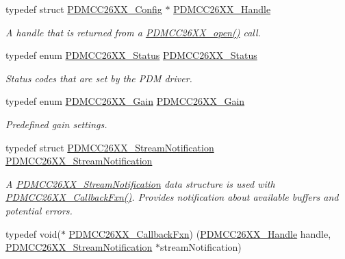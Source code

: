 \begin{DoxyCompactItemize}
typedef struct \hyperlink{struct_p_d_m_c_c26_x_x___config}{P\+D\+M\+C\+C26\+X\+X\+\_\+\+Config} $\ast$ \hyperlink{_p_d_m_c_c26_x_x_8h_ae5b9ecc0f8eb494e162b4a0a49c0636a}{P\+D\+M\+C\+C26\+X\+X\+\_\+\+Handle}
\begin{DoxyCompactList}\small\item\em A handle that is returned from a \hyperlink{_p_d_m_c_c26_x_x_8h_a431d9b71e0d0eebd5ab85960f1c82ee0}{P\+D\+M\+C\+C26\+X\+X\+\_\+open()} call. \end{DoxyCompactList}\item 
typedef enum \hyperlink{_p_d_m_c_c26_x_x_8h_afbfe993e790be75708df00186070a779}{P\+D\+M\+C\+C26\+X\+X\+\_\+\+Status} \hyperlink{_p_d_m_c_c26_x_x_8h_affb09af7b7de674b100b1170d574f86c}{P\+D\+M\+C\+C26\+X\+X\+\_\+\+Status}
\begin{DoxyCompactList}\small\item\em Status codes that are set by the P\+D\+M driver. \end{DoxyCompactList}\item 
typedef enum \hyperlink{_p_d_m_c_c26_x_x_8h_a8c2d67aee547a2c8228465034ae0267f}{P\+D\+M\+C\+C26\+X\+X\+\_\+\+Gain} \hyperlink{_p_d_m_c_c26_x_x_8h_a62dc3dc8663629a376fc5e4e546bfd05}{P\+D\+M\+C\+C26\+X\+X\+\_\+\+Gain}
\begin{DoxyCompactList}\small\item\em Predefined gain settings. \end{DoxyCompactList}\item 
typedef struct \hyperlink{struct_p_d_m_c_c26_x_x___stream_notification}{P\+D\+M\+C\+C26\+X\+X\+\_\+\+Stream\+Notification} \hyperlink{_p_d_m_c_c26_x_x_8h_abebd17c183efa14ae0ebe9c229f6c577}{P\+D\+M\+C\+C26\+X\+X\+\_\+\+Stream\+Notification}
\begin{DoxyCompactList}\small\item\em A \hyperlink{struct_p_d_m_c_c26_x_x___stream_notification}{P\+D\+M\+C\+C26\+X\+X\+\_\+\+Stream\+Notification} data structure is used with \hyperlink{_p_d_m_c_c26_x_x_8h_ab6fdee59a79029e938e3fbf0e446fa91}{P\+D\+M\+C\+C26\+X\+X\+\_\+\+Callback\+Fxn()}. Provides notification about available buffers and potential errors. \end{DoxyCompactList}\item 
typedef void($\ast$ \hyperlink{_p_d_m_c_c26_x_x_8h_ab6fdee59a79029e938e3fbf0e446fa91}{P\+D\+M\+C\+C26\+X\+X\+\_\+\+Callback\+Fxn}) (\hyperlink{_p_d_m_c_c26_x_x_8h_ae5b9ecc0f8eb494e162b4a0a49c0636a}{P\+D\+M\+C\+C26\+X\+X\+\_\+\+Handle} handle, \hyperlink{struct_p_d_m_c_c26_x_x___stream_notification}{P\+D\+M\+C\+C26\+X\+X\+\_\+\+Stream\+Notification} $\ast$stream\+Notification)

\end{DoxyCompactItemize}
